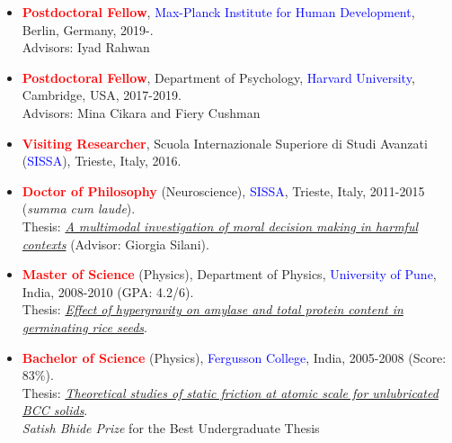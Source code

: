 \documentclass[10pt]{article}
\begin{document}
	\header
	
    
    \begin{itemize}
	
	\item \textbf{\textcolor{red}{Postdoctoral Fellow}}, \textcolor{blue}{Max-Planck Institute for Human Development}, Berlin, Germany, 2019-.\\
	Advisors: Iyad Rahwan
	
	
	\item \textbf{\textcolor{red}{Postdoctoral Fellow}}, Department of Psychology, \textcolor{blue}{Harvard University}, Cambridge, USA, 2017-2019.\\
	Advisors: Mina Cikara and Fiery Cushman
	
	
	\item \textbf{\textcolor{red}{Visiting Researcher}}, Scuola Internazionale Superiore di Studi Avanzati (\textcolor{blue}{SISSA}), Trieste, Italy, 2016.
	
	\end{itemize}
	
	
	\begin{itemize}
	
	\item \textbf{\textcolor{red}{Doctor of Philosophy}} (Neuroscience), \textcolor{blue}{SISSA}, Trieste, Italy, 2011-2015 (\textit{summa cum laude}).\\ 
	Thesis: \href{https://drive.google.com/open?id=1g8L7pf-SutYTWt-8yJ44bV96cixMBZuh}{\it A multimodal investigation of moral decision making in harmful contexts} (Advisor: Giorgia Silani).
	 
	
	\item \textbf{\textcolor{red}{Master of Science}} (Physics), Department of Physics, \textcolor{blue}{University of Pune}, India, 2008-2010 (GPA: 4.2/6).\\
	Thesis: \href{https://drive.google.com/open?id=0B6_u70YpdJKnMTJEMkI2RkQyNjc2QjJFOTowLjEx}{\it Effect of hypergravity on amylase and total protein content in germinating rice seeds}.
	
	
	\item \textbf{\textcolor{red}{Bachelor of Science}} (Physics), \textcolor{blue}{Fergusson College}, India, 2005-2008 (Score: 83$\%$).\\
	Thesis: \href{https://drive.google.com/open?id=0B6_u70YpdJKnMTIxNTkyODMxMzBBMkYyMDowLjEz}{\it Theoretical studies of static friction at atomic scale for unlubricated BCC solids}.\\
	{\it Satish Bhide Prize} for the Best Undergraduate Thesis 
	
	
	
    \end{itemize}
    
\end{document}
